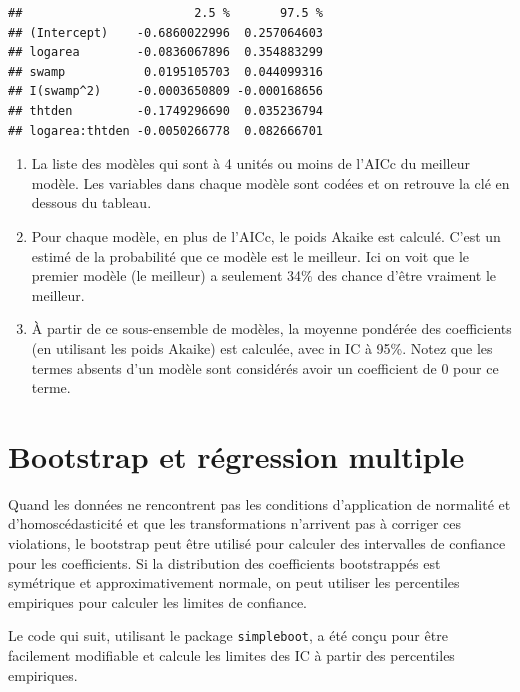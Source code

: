 \documentclass[12pt,]{book}
\providecommand{\tightlist}{%
  \setlength{\itemsep}{0pt}\setlength{\parskip}{0pt}}
\begin{document}
\begin{verbatim}
##                        2.5 %       97.5 %
## (Intercept)    -0.6860022996  0.257064603
## logarea        -0.0836067896  0.354883299
## swamp           0.0195105703  0.044099316
## I(swamp^2)     -0.0003650809 -0.000168656
## thtden         -0.1749296690  0.035236794
## logarea:thtden -0.0050266778  0.082666701
\end{verbatim}

\begin{enumerate}
\def\labelenumi{\arabic{enumi}.}
\tightlist
\item
  La liste des modèles qui sont à 4 unités ou moins de l'AICc du meilleur modèle. Les variables dans chaque modèle sont codées et on retrouve la clé en dessous du tableau.
\item
  Pour chaque modèle, en plus de l'AICc, le poids Akaike est calculé. C'est un estimé de la probabilité que ce modèle est le meilleur. Ici on voit que le premier modèle (le meilleur) a seulement 34\% des chance d'être vraiment le meilleur.
\item
  À partir de ce sous-ensemble de modèles, la moyenne pondérée des coefficients (en utilisant les poids Akaike) est calculée, avec in IC à 95\%. Notez que les termes absents d'un modèle sont considérés avoir un coefficient de 0 pour ce terme.
\end{enumerate}

\hypertarget{bootstrap-et-ruxe9gression-multiple}{%
\section{Bootstrap et régression multiple}\label{bootstrap-et-ruxe9gression-multiple}}

Quand les données ne rencontrent pas les conditions d'application de normalité et d'homoscédasticité et que les transformations n'arrivent pas à corriger ces violations, le bootstrap peut être utilisé pour calculer des intervalles de confiance pour les coefficients. Si la distribution des coefficients bootstrappés est symétrique et approximativement normale, on peut utiliser les percentiles empiriques pour calculer les limites de confiance.

Le code qui suit, utilisant le package \texttt{simpleboot}, a été conçu pour être facilement modifiable et calcule les limites des IC à partir des percentiles empiriques.
\end{document}
